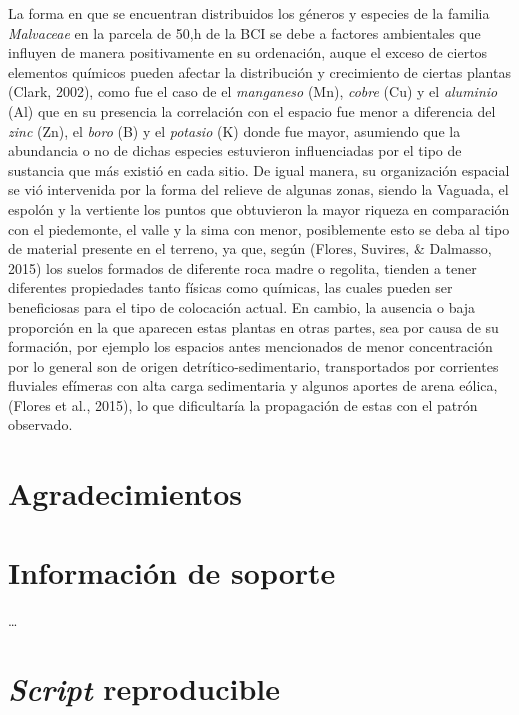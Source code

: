 \documentclass[11pt,]{article}
\begin{document}
La forma en que se encuentran distribuidos los géneros y especies de la
familia \emph{Malvaceae} en la parcela de 50,h de la BCI se debe a
factores ambientales que influyen de manera positivamente en su
ordenación, auque el exceso de ciertos elementos químicos pueden afectar
la distribución y crecimiento de ciertas plantas (Clark, 2002), como fue
el caso de el \emph{manganeso} (Mn), \emph{cobre} (Cu) y el
\emph{aluminio} (Al) que en su presencia la correlación con el espacio
fue menor a diferencia del \emph{zinc} (Zn), el \emph{boro} (B) y el
\emph{potasio} (K) donde fue mayor, asumiendo que la abundancia o no de
dichas especies estuvieron influenciadas por el tipo de sustancia que
más existió en cada sitio. De igual manera, su organización espacial se
vió intervenida por la forma del relieve de algunas zonas, siendo la
Vaguada, el espolón y la vertiente los puntos que obtuvieron la mayor
riqueza en comparación con el piedemonte, el valle y la sima con menor,
posiblemente esto se deba al tipo de material presente en el terreno, ya
que, según (Flores, Suvires, \& Dalmasso, 2015) los suelos formados de
diferente roca madre o regolita, tienden a tener diferentes propiedades
tanto físicas como químicas, las cuales pueden ser beneficiosas para el
tipo de colocación actual. En cambio, la ausencia o baja proporción en
la que aparecen estas plantas en otras partes, sea por causa de su
formación, por ejemplo los espacios antes mencionados de menor
concentración por lo general son de origen detrítico-sedimentario,
transportados por corrientes fluviales efímeras con alta carga
sedimentaria y algunos aportes de arena eólica, (Flores et al., 2015),
lo que dificultaría la propagación de estas con el patrón observado.

\section{Agradecimientos}\label{agradecimientos}

\section{Información de soporte}\label{informaciuxf3n-de-soporte}

\ldots

\section{\texorpdfstring{\emph{Script}
reproducible}{Script reproducible}}\label{script-reproducible}
\end{document}
